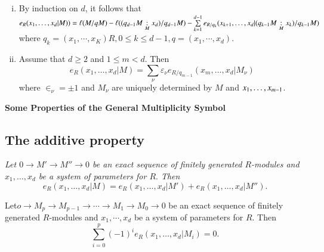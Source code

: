 \setcounter{remarks}{3}
\begin{remarks}\label{chap1:sec2:rem1.4}
\begin{enumerate}[(i)]
\item By induction on $d$, it follows that 
  $e_R (x_1,\ldots,\break x_d |M)) = \ell (M/qM)- \ell ((q_{d-1} M
  \underset{M}{:} x_d)/q_{d-1}M)- \sum\limits^{d-1}_{k=1} e_{R/q_k}
  (x_{k+1}, \ldots,\break  x_d | (q_{k-1} M \underset{M}{:} x_k)/q_{k-1}M)$ 
  where $q_k = (x_1, \cdots, x_K) R, 0 \le k \le d-1, q = (x_1,\cdots,x_d)$.
\item Assume that $d \geq 2$ and $1 \leq m < d$. Then
  $$
  e_R(x_1,\ldots,x_d |M) = \sum_\nu \varepsilon_\nu e_{R/q_{m-1}}
  (x_m,\ldots,x_d |M_\nu) 
  $$
  where $\in_\nu = \pm 1 $ and $M_\nu$ are uniquely determined by $M$
  and $x_1,\ldots,\break x_{m-1}$. 
\end{enumerate}
\end{remarks}

\noindent \textbf{\large Some Properties of the General Multiplicity Symbol}

\setcounter{subsection}{4}
\subsection{The additive property}\label{chap1:sec2:subsec1.5} 

\textit{Let $0 \to M' \to M'' \to 0$ be an exact sequence of finitely
  generated $R$-modules and $x_1, \ldots, x_d$ be a system of parameters
  for $R.$ Then} 
$$
e_R(x_1, \ldots, x_d|M) = e_R (x_1, \ldots, x_d|M') + e_R (x_1,
\ldots, x_d|M''). 
$$

\setcounter{corollary}{5}
\begin{corollary}\label{chap1:sec2:coro1.6}
  Let\pageoriginale $o \to M_p \to M_{p-1} \to \cdots \to M_1 \to M_0 \to 0$ be an
  exact sequence of finitely generated $R$-modules and $x_1, \cdots, x_d$
  be a system of parameters for $R$. Then 
  $$
  \sum^{p}_{i = 0} (-1)^i e_R (x_1, \ldots, x_d|M_i) = 0.
  $$
\end{corollary}

